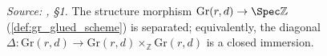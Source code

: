 \begin{lemma}\leanok
  \label{lem:gr_separated}
  \textit{Source: \cite{nitsure-hilbert-quot}, \S 1.}
  The structure morphism \(\mathrm{Gr}(r,d) \to \Spec \mathbb{Z}\)
  (\cref{def:gr_glued_scheme}) is separated; equivalently, the diagonal
  \(\Delta : \mathrm{Gr}(r,d) \to \mathrm{Gr}(r,d) \times_{\mathbb{Z}}
  \mathrm{Gr}(r,d)\) is a closed immersion.
\end{lemma}


